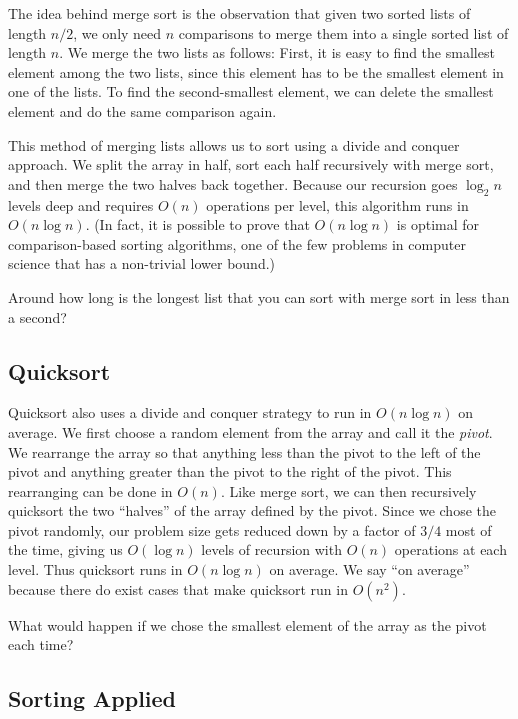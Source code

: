 The idea behind merge sort is the observation that given two sorted lists of length $n/2$, we only need $n$ comparisons to merge them into a single sorted list of length $n$. We merge the two lists as follows: First, it is easy to find the smallest element among the two lists, since this element has to be the smallest element in one of the lists. To find the second-smallest element, we can delete the smallest element and do the same comparison again.

This method of merging lists allows us to sort using a divide and conquer approach. We split the array in half, sort each half recursively with merge sort, and then merge the two halves back together. Because our recursion goes $\log_2 n$ levels deep and requires $O(n)$ operations per level, this algorithm runs in $O(n \log n)$. (In fact, it is possible to prove that $O(n \log n)$ is optimal for comparison-based sorting algorithms, one of the few problems in computer science that has a non-trivial lower bound.)

\begin{exercise}
  Around how long is the longest list that you can sort with merge sort in less than a second?
\end{exercise}

\subsection{Quicksort}

Quicksort also uses a divide and conquer strategy to run in $O(n \log n)$ on average. We first choose a random element from the array and call it the \emph{pivot}. We rearrange the array so that anything less than the pivot to the left of the pivot and anything greater than the pivot to the right of the pivot. This rearranging can be done in $O(n)$. Like merge sort, we can then recursively quicksort the two ``halves'' of the array defined by the pivot. Since we chose the pivot randomly, our problem size gets reduced down by a factor of $3/4$ most of the time, giving us $O(\log n)$ levels of recursion with $O(n)$ operations at each level. Thus quicksort runs in $O(n \log n)$ on average. We say ``on average'' because there do exist cases that make quicksort run in $O(n^2)$.

\begin{exercise}
  What would happen if we chose the smallest element of the array as the pivot each time?
\end{exercise}

\subsection{Sorting Applied}


